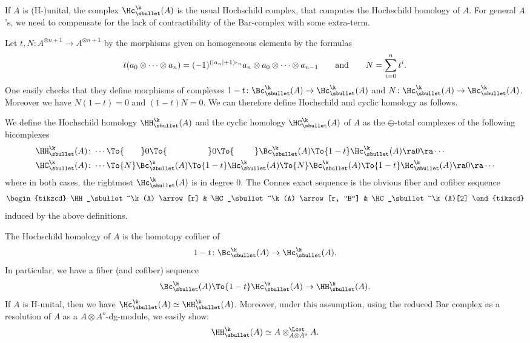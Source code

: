 If $A$ is (H-)unital, the complex $\Hc_\sbullet^\k(A)$ is the usual Hochschild complex, that computes the Hochschild homology of $A$. For general $A$'s, we need to compensate for the lack of contractibility of the Bar-complex with some extra-term.

Let $t,N \colon A^{\otimes n+1} \to A^{\otimes n+1}$ by the morphisms given on homogeneous elements by the formulas
\[
t(a_0 \otimes \cdots \otimes a_n) = (-1)^{(|a_n|+1)\epsilon_n} a_n \otimes a_0 \otimes \cdots \otimes a_{n-1} \hspace{7mm} \text{and} \hspace{7mm} N = \sum_{i=0}^n t^i.
\]
One easily checks that they define morphisms of complexes $1-t \colon \Bc_\sbullet^\k(A) \to \Hc_\sbullet^\k(A)$ and $N \colon \Hc_\sbullet^\k(A) \to \Bc_\sbullet^\k(A)$. Moreover we have $N(1-t) = 0$ and $(1-t)N = 0$. We can therefore define Hochschild and cyclic homology as follows.

\begin{df}
We define the Hochschild homology $\HH_\sbullet^\k(A)$ and the cyclic homology $\HC_\sbullet^\k(A)$ of $A$ as the $\oplus$-total complexes of the following bicomplexes
\begin{align*}
\HH_\sbullet^\k(A)\colon&\cdots \To{\hspace*{7mm}}  0 \To{\hspace*{17mm}}  0 \To{\hspace*{8.5mm}}  \Bc_\sbullet^\k(A) \To{1-t}  \Hc_\sbullet^\k(A) \ra  0 \ra  \cdots
\\
\HC_\sbullet^\k(A) \colon&\cdots \To{N} \Bc_\sbullet^\k(A) \To{1-t}  \Hc_\sbullet^\k(A) \To{N}  \Bc_\sbullet^\k(A) \To{1-t} \Hc_\sbullet^\k(A) \ra  0 \ra\cdots
\end{align*}
where in both cases, the rightmost $\Hc_\sbullet^\k(A)$ is in degree $0$.
The Connes exact sequence is the obvious fiber and cofiber sequence
\[
\begin{tikzcd}
\HH_\sbullet^\k(A) \arrow[r] & \HC_\sbullet^\k(A) \arrow[r, "B"] & \HC_\sbullet^\k(A)[2]
\end{tikzcd}
\]
induced by the above definitions.
\end{df}

\begin{rmq}
The Hochschild homology of $A$ is the homotopy cofiber of
\[
1-t \colon \Bc_\sbullet^\k(A) \to \Hc_\sbullet^\k(A).
\]
In particular, we have a fiber (and cofiber) sequence
\[
\Bc_\sbullet^\k(A) \To{1-t} \Hc_\sbullet^\k(A) \to \HH_\sbullet^\k(A).
\]
If $A$ is H-unital, then we have $\Hc_\sbullet^\k(A) \simeq \HH_\sbullet^\k(A)$.
Moreover, under this assumption, using the reduced Bar complex as a resolution of $A$ as a $A \otimes A^o$-dg-module, we easily show:
\[
\HH_\sbullet^\k(A) \simeq A \otimes^\Lcot_{A \otimes A^o} A.
\]
\end{rmq}

